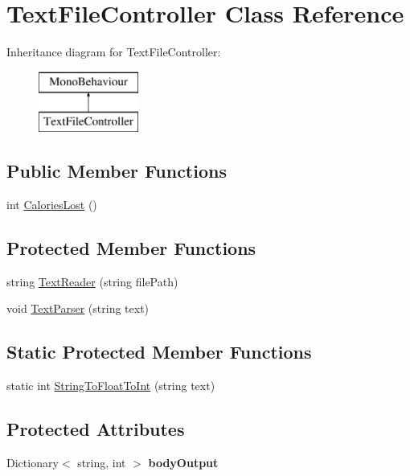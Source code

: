 \hypertarget{class_text_file_controller}{}\section{Text\+File\+Controller Class Reference}
\label{class_text_file_controller}
Inheritance diagram for Text\+File\+Controller\+:\begin{figure}[H]
\begin{center}
\leavevmode
\includegraphics[height=2.000000cm]{class_text_file_controller}
\end{center}
\end{figure}
\subsection*{Public Member Functions}
\begin{DoxyCompactItemize}
\item 
int \mbox{\hyperlink{class_text_file_controller_a331013e33f02f03d7572f4fa2012cb1f}{Calories\+Lost}} ()
\end{DoxyCompactItemize}
\subsection*{Protected Member Functions}
\begin{DoxyCompactItemize}
\item 
string \mbox{\hyperlink{class_text_file_controller_ac6f1c084100c2444e52297bab26329ce}{Text\+Reader}} (string file\+Path)
\item 
void \mbox{\hyperlink{class_text_file_controller_a9d4855b5a0e296eea72c933dc23e8b3a}{Text\+Parser}} (string text)
\end{DoxyCompactItemize}
\subsection*{Static Protected Member Functions}
\begin{DoxyCompactItemize}
\item 
static int \mbox{\hyperlink{class_text_file_controller_a5c731a196ad06e75f09e3f449997bdba}{String\+To\+Float\+To\+Int}} (string text)
\end{DoxyCompactItemize}
\subsection*{Protected Attributes}
\begin{DoxyCompactItemize}
\item 
\mbox{\label{class_text_file_controller_ae9e9561a329074315972d9351171f51d}} 
Dictionary$<$ string, int $>$ {\bfseries body\+Output}
\end{DoxyCompactItemize}

